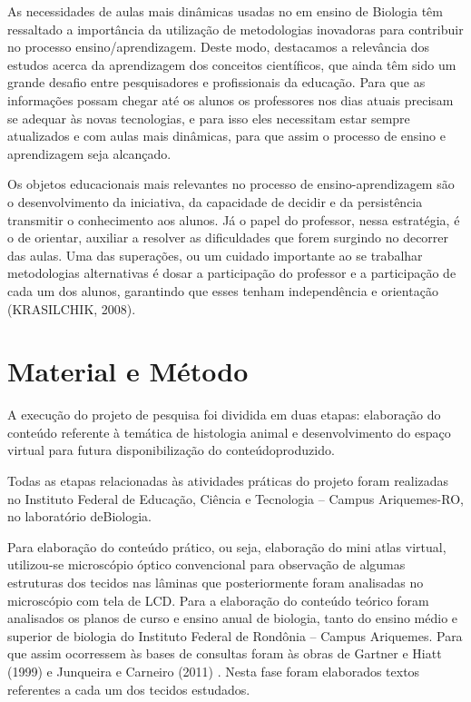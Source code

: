 \documentclass[article,12pt,onesidea,4paper,english,brazil]{abntex2}
\begin{document}
	As necessidades de aulas mais dinâmicas usadas no em ensino de Biologia têm ressaltado a importância da utilização de metodologias inovadoras para contribuir no processo ensino/aprendizagem. Deste modo, destacamos a relevância dos estudos acerca da aprendizagem dos conceitos científicos, que ainda têm sido um grande desafio entre pesquisadores e profissionais da educação. Para que as informações possam chegar até os alunos os professores nos dias atuais precisam se adequar às novas tecnologias, e para isso eles necessitam estar sempre atualizados e com aulas mais dinâmicas, para que assim o processo de ensino e aprendizagem seja alcançado.
	
	Os objetos educacionais mais relevantes no processo de ensino-aprendizagem são o desenvolvimento da iniciativa, da capacidade de decidir e da persistência transmitir o conhecimento aos alunos. Já o papel do professor, nessa estratégia, é o de orientar, auxiliar a resolver as dificuldades que forem surgindo no decorrer das aulas. Uma das superações, ou um cuidado importante ao se trabalhar metodologias alternativas é dosar a participação do professor e a participação de cada um dos alunos, garantindo que esses tenham independência e orientação (KRASILCHIK, 2008).
	
	\section*{Material e Método}
	
	A execução do projeto de pesquisa foi dividida em duas etapas: elaboração do conteúdo referente à temática de histologia animal e desenvolvimento do espaço virtual para futura disponibilização do conteúdoproduzido.
	
	Todas as etapas relacionadas às atividades práticas do projeto foram realizadas no Instituto Federal de Educação, Ciência e Tecnologia – Campus Ariquemes-RO, no laboratório deBiologia.
	
	Para elaboração do conteúdo prático, ou seja, elaboração do mini atlas virtual, utilizou-se microscópio óptico convencional para observação de algumas estruturas dos tecidos nas lâminas que posteriormente foram analisadas no microscópio com tela de LCD. Para a elaboração do conteúdo teórico foram analisados os planos de curso e ensino anual de biologia, tanto do ensino médio e superior de biologia do Instituto Federal de Rondônia – Campus Ariquemes. Para que assim ocorressem às bases de consultas foram às obras de Gartner e Hiatt (1999) e Junqueira e Carneiro (2011) . Nesta fase foram elaborados textos referentes a cada um dos tecidos estudados.
	
\end{document}
